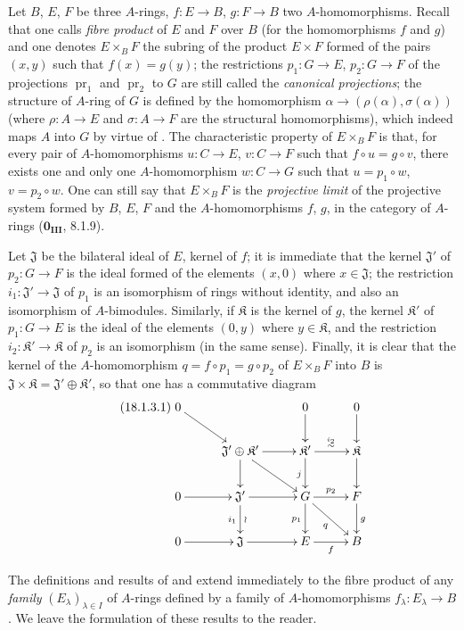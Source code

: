 \begin{env}[18.1.2]
\label{0.18.1.2}
Let $B$, $E$, $F$ be three $A$-rings, $f:E\to B$, $g:F\to B$ two $A$-homomorphisms.
Recall that one calls \emph{fibre product} of $E$ and $F$ over $B$ (for the homomorphisms $f$ and $g$) and one denotes $E\times_B F$ the subring of the product $E\times F$ formed of the pairs $(x,y)$ such that $f(x)=g(y)$; the restrictions $p_1:G\to E$, $p_2:G\to F$ of the projections $\operatorname{pr}_1$ and $\operatorname{pr}_2$ to $G$ are still called the \emph{canonical projections};
the structure of $A$-ring of $G$ is defined by the homomorphism $\alpha\to(\rho(\alpha),\sigma(\alpha))$ (where $\rho:A\to E$ and $\sigma:A\to F$ are the structural homomorphisms), which indeed maps $A$ into $G$ by virtue of .
The characteristic property of $E\times_B F$ is that, for every pair of $A$-homomorphisms $u:C\to E$, $v:C\to F$ such that $f\circ u=g\circ v$, there exists one and only one $A$-homomorphism $w:C\to G$ such that $u=p_1\circ w$, $v=p_2\circ w$.
One can still say that $E\times_B F$ is the \emph{projective limit} of the projective system formed by $B$, $E$, $F$ and the $A$-homomorphisms $f$, $g$, in the category of $A$-rings ($\mathbf{0_{III}}$, 8.1.9).
\end{env}

\begin{env}[18.1.3]
\label{0.18.1.3}
Let $\mathfrak{J}$ be the bilateral ideal of $E$, kernel of $f$; it is immediate that the kernel $\mathfrak{J}'$ of $p_2:G\to F$ is the ideal formed of the elements $(x,0)$ where $x\in\mathfrak{J}$; the restriction $i_1:\mathfrak{J}'\to\mathfrak{J}$ of $p_1$ is an isomorphism of rings without identity, and also an isomorphism of $A$-bimodules.
Similarly, if $\mathfrak{K}$ is the kernel of $g$, the kernel $\mathfrak{K}'$ of $p_1:G\to E$ is the ideal of the elements $(0,y)$ where $y\in\mathfrak{K}$, and the restriction $i_2:\mathfrak{K}'\to\mathfrak{K}$ of $p_2$ is an isomorphism (in the same sense).
Finally, it is clear that the kernel of the $A$-homomorphism $q=f\circ p_1=g\circ p_2$ of $E\times_B F$ into $B$ is $\mathfrak{J}\times\mathfrak{K}=\mathfrak{J}'\oplus\mathfrak{K}'$, so that one has a commutative diagram
\begin{equation}
\tag{18.1.3.1}
  \label{0.18.1.3.1}
  \xymatrix@C=2.2pc@R=1.8pc{
    0\ar[dr] & & 0\ar[d] & 0\ar[d]\\
    & \mathfrak{J}'\oplus\mathfrak{K}'\ar[r]\ar[d]\ar[dr]
      & \mathfrak{K}'\ar[r]^{\overset{i_2}{\sim}}\ar[d]_j
      & \mathfrak{K}\ar[d]\\
    0\ar[r] & \mathfrak{J}'\ar[r]\ar[d]_{i_1}^{\wr}
      & G\ar[r]^{p_2}\ar[d]_{p_1}\ar[dr]_q & F\ar[d]^g\\
    0\ar[r] & \mathfrak{J}\ar[r] & E\ar[r]_f & B
  }
\end{equation}

The definitions and results of  and  extend immediately to the fibre product of any \emph{family} $(E_\lambda)_{\lambda\in I}$ of $A$-rings defined by a family of $A$-homomorphisms $f_\lambda:E_\lambda\to B$.
We leave the formulation of these results to the reader.
\end{env}

